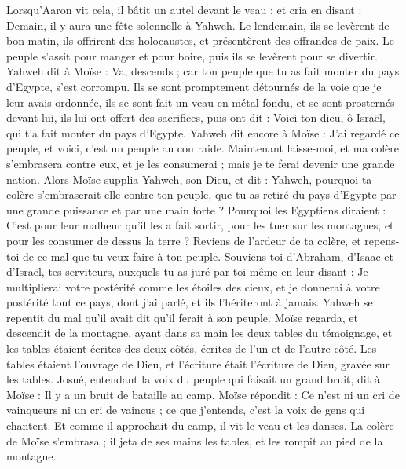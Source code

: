 \begin{multicols}{2}
Lorsqu’Aaron vit cela, il bâtit un autel devant le veau ; et cria en disant : Demain, il y aura une fête solennelle à Yahweh.
Le lendemain, ils se levèrent de bon matin, ils offrirent des holocaustes, et présentèrent des offrandes de paix. Le peuple s'assit pour manger et pour boire, puis ils se levèrent pour se divertir.
Yahweh dit à Moïse : Va, descends ; car ton peuple que tu as fait monter du pays d'Egypte, s'est corrompu.
Ils se sont promptement détournés de la voie que je leur avais ordonnée, ils se sont fait un veau en métal fondu, et se sont prosternés devant lui, ils lui ont offert des sacrifices, puis ont dit : Voici ton dieu, ô Israël, qui t'a fait monter du pays d'Egypte.
Yahweh dit encore à Moïse : J'ai regardé ce peuple, et voici, c'est un peuple au cou raide.
Maintenant laisse-moi, et ma colère s'embrasera contre eux, et je les consumerai ; mais je te ferai devenir une grande nation.
Alors Moïse supplia Yahweh, son Dieu, et dit : Yahweh, pourquoi ta colère s'embraserait-elle contre ton peuple, que tu as retiré du pays d'Egypte par une grande puissance et par une main forte ?
Pourquoi les Egyptiens diraient : C’est pour leur malheur qu’il les a fait sortir, pour les tuer sur les montagnes, et pour les consumer de dessus la terre ? Reviens de l'ardeur de ta colère, et repens-toi de ce mal que tu veux faire à ton peuple.
Souviens-toi d'Abraham, d'Isaac et d'Israël, tes serviteurs, auxquels tu as juré par toi-même en leur disant : Je multiplierai votre postérité comme les étoiles des cieux, et je donnerai à votre postérité tout ce pays, dont j'ai parlé, et ils l'hériteront à jamais.
Yahweh se repentit du mal qu'il avait dit qu'il ferait à son peuple.
Moïse regarda, et descendit de la montagne, ayant dans sa main les deux tables du témoignage, et les tables étaient écrites des deux côtés, écrites de l’un et de l’autre côté.
Les tables étaient l'ouvrage de Dieu, et l'écriture était l'écriture de Dieu, gravée sur les tables.
Josué, entendant la voix du peuple qui faisait un grand bruit, dit à Moïse : Il y a un bruit de bataille au camp.
Moïse répondit : Ce n’est ni un cri de vainqueurs ni un cri de vaincus ; ce que j’entends, c’est la voix de gens qui chantent.
Et comme il approchait du camp, il vit le veau et les danses. La colère de Moïse s'embrasa ; il jeta de ses mains les tables, et les rompit au pied de la montagne.

\end{multicols}
